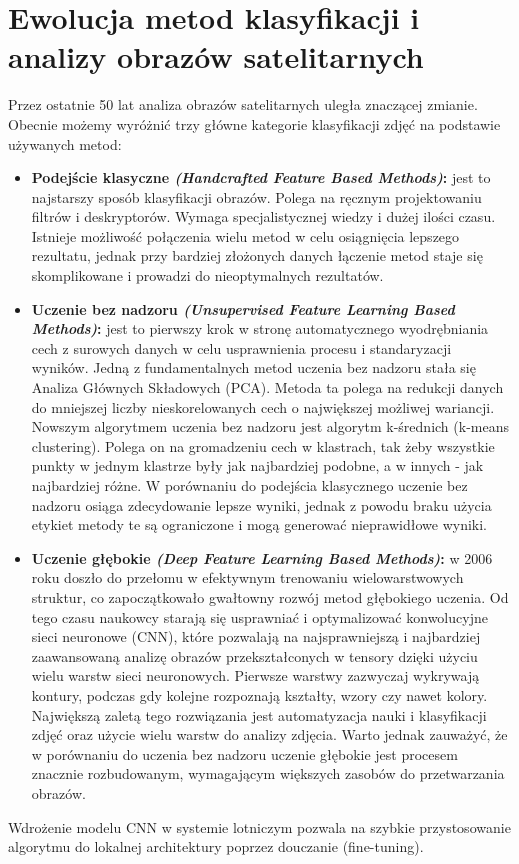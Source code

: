 \documentclass[12pt, a4paper]{report}
\begin{document}
\section{Ewolucja metod klasyfikacji i analizy obrazów satelitarnych}
\par Przez ostatnie 50 lat analiza obrazów satelitarnych uległa znaczącej zmianie. \cite{cheng_remote_sensing} Obecnie możemy wyróżnić trzy główne kategorie klasyfikacji zdjęć na podstawie używanych metod:
\begin{itemize}
\item \textbf{Podejście klasyczne \emph{(Handcrafted Feature Based Methods)}:} jest to najstarszy sposób klasyfikacji obrazów. Polega na ręcznym projektowaniu filtrów i deskryptorów. Wymaga specjalistycznej wiedzy i dużej ilości czasu. Istnieje możliwość połączenia wielu metod w celu osiągnięcia lepszego rezultatu, jednak przy bardziej złożonych danych łączenie metod staje się skomplikowane i prowadzi do nieoptymalnych rezultatów.
\item \textbf{Uczenie bez nadzoru \emph{(Unsupervised Feature Learning Based Methods)}:} jest to pierwszy krok w stronę automatycznego wyodrębniania cech z surowych danych w celu usprawnienia procesu i standaryzacji wyników. Jedną z fundamentalnych metod uczenia bez nadzoru stała się Analiza Głównych Składowych (PCA). Metoda ta polega na redukcji danych do mniejszej liczby nieskorelowanych cech o największej możliwej wariancji. Nowszym algorytmem uczenia bez nadzoru jest algorytm k-średnich (k-means clustering). Polega on na gromadzeniu cech w klastrach, tak żeby wszystkie punkty w jednym klastrze były jak najbardziej podobne, a w innych - jak najbardziej różne. W porównaniu do podejścia klasycznego uczenie bez nadzoru osiąga zdecydowanie lepsze wyniki, jednak z powodu braku użycia etykiet metody te są ograniczone i mogą generować nieprawidłowe wyniki. 
\item \textbf{Uczenie głębokie \emph{(Deep Feature Learning Based Methods)}:} w 2006 roku doszło do przełomu w efektywnym trenowaniu wielowarstwowych struktur, co zapoczątkowało gwałtowny rozwój metod głębokiego uczenia. Od tego czasu naukowcy starają się usprawniać i optymalizować konwolucyjne sieci neuronowe (CNN), które pozwalają na najsprawniejszą i najbardziej zaawansowaną analizę obrazów przekształconych w tensory dzięki użyciu wielu warstw sieci neuronowych. Pierwsze warstwy zazwyczaj wykrywają kontury, podczas gdy kolejne rozpoznają kształty, wzory czy nawet kolory. Największą zaletą tego rozwiązania jest automatyzacja nauki i klasyfikacji zdjęć oraz użycie wielu warstw do analizy zdjęcia. Warto jednak zauważyć, że w porównaniu do uczenia bez nadzoru uczenie głębokie jest procesem znacznie rozbudowanym, wymagającym większych zasobów do przetwarzania obrazów.
\end{itemize}
Wdrożenie modelu CNN w systemie lotniczym pozwala na szybkie przystosowanie algorytmu do lokalnej architektury poprzez douczanie (fine-tuning).
\end{document}
